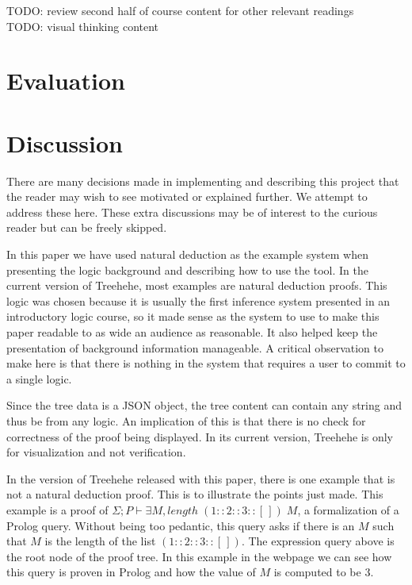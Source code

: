 \documentclass[conference]{IEEEtran}
\newcommand{\projectname}{Treehehe}
\begin{document}
TODO: review second half of course content for other relevant readings \\

TODO: visual thinking content \\

\section{Evaluation}
\label{sec:evaluation}



\section{Discussion}
\label{sec:discussion}

There are many decisions made in implementing and describing this project that the reader may wish to see motivated or explained further. We attempt to address these here. These extra discussions may be of interest to the curious reader but can be freely skipped.

In this paper we have used natural deduction as the example system when presenting the logic background and describing how to use the tool. In the current version of \projectname{}, most examples are natural deduction proofs. This logic was chosen because it is usually the first inference system presented in an introductory logic course, so it made sense as the system to use to make this paper readable to as wide an audience as reasonable. It also helped keep the presentation of background information manageable. A critical observation to make here is that there is nothing in the system that requires a user to commit to a single logic.

Since the tree data is a JSON object, the tree content can contain any string and thus be from any logic. An implication of this is that there is no check for correctness of the proof being displayed. In its current version, \projectname{} is only for visualization and not verification.

In the version of \projectname{} released with this paper, there is one example that is not a natural deduction proof. This is to illustrate the points just made. This example is a proof of $\Sigma ; P \vdash \exists M, \mathit{length} \; (1 :: 2 :: 3 :: [ \, ]) \; M$, a formalization of a Prolog query. Without being too pedantic, this query asks if there is an $M$ such that $M$ is the length of the list $(1 :: 2 :: 3 :: [\, ])$. The expression query above is the root node of the proof tree. In this example in the webpage we can see how this query is proven in Prolog and how the value of $M$ is computed to be 3.
\end{document}

